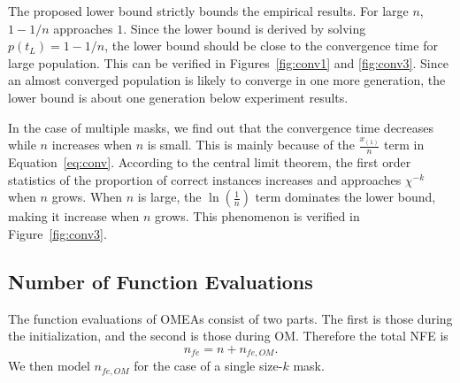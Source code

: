 \documentclass{sig-alternate}
\begin{document}
The proposed lower bound strictly bounds the empirical results.
For large $n$, $1-1/n$ approaches $1$.
Since the lower bound is derived by solving $p\left(t_L\right) = 1-1/n$,
the lower bound should be close to the convergence time for large population.
This can be verified in Figures~\ref{fig:conv1} and \ref{fig:conv3}.
Since an almost converged population is likely to converge in one more generation,
the lower bound is about one generation below experiment results.

In the case of multiple masks,
we find out that the convergence time decreases while $n$ increases when $n$ is small.
This is mainly because of the $\frac{x_{\left(1\right)}}{n}$ term in Equation~\ref{eq:conv}.
According to the central limit theorem,
the first order statistics of the proportion of correct instances increases and approaches $\chi^{-k}$ when $n$ grows.
When $n$ is large, the $\ln{\left(\frac{1}{n}\right)}$ term dominates the lower bound, making it increase when $n$ grows.
This phenomenon is verified in Figure~\ref{fig:conv3}.



\subsection{Number of Function Evaluations}\label{sec:nfe}

The function evaluations of OMEAs consist of two parts.
The first is those during the initialization, and the second is those during OM.
Therefore the total NFE is
\begin{equation}
n_{fe} = n + n_{fe,OM}.
\end{equation}
We then model $n_{fe,OM}$ for the case of a single size-$k$ mask.
\end{document}

